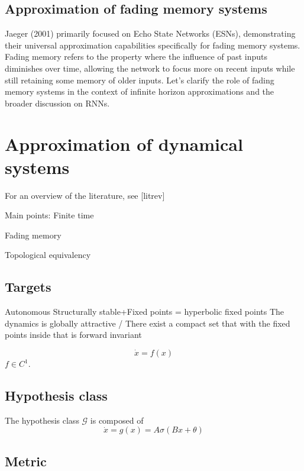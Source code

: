 \documentclass{article}
\theoremstyle{definition}
\theoremstyle{remark}
\begin{document}
\subsection{Approximation of fading memory systems}
 Jaeger (2001) primarily focused on Echo State Networks (ESNs), demonstrating their universal approximation capabilities specifically for fading memory systems. Fading memory refers to the property where the influence of past inputs diminishes over time, allowing the network to focus more on recent inputs while still retaining some memory of older inputs. Let’s clarify the role of fading memory systems in the context of infinite horizon approximations and the broader discussion on RNNs.



\section{Approximation of dynamical systems}
For an overview of the literature, see [litrev]

Main points:
Finite time \citep{funahashi1993approximation}


Fading memory \citep{boyd1985fading}


Topological equivalency \citep{hart2020recurrent}


\subsection{Targets}
Autonomous
Structurally stable+Fixed points = hyperbolic fixed points
The dynamics is globally attractive / There exist a compact set that with the fixed points inside that is forward invariant 

\begin{equation}
\dot x = f(x)
\end{equation}
$f\in C^1$.

\subsection{Hypothesis class}
The hypothesis class $\mathcal{G}$ is composed of
\begin{equation}
\dot x = g(x) = A\sigma(Bx+\theta)
\end{equation}


\subsection{Metric}
\end{document}
